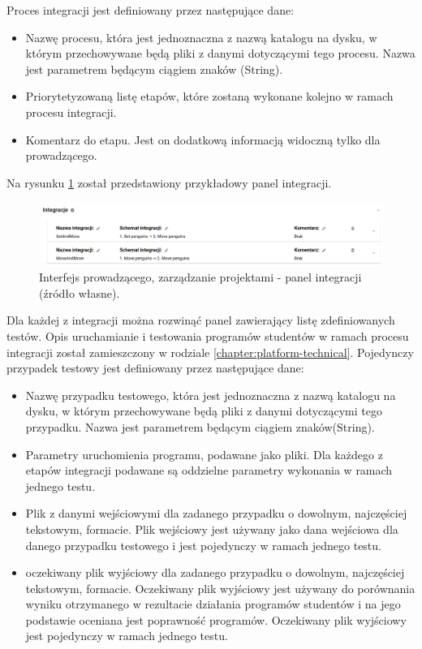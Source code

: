Proces integracji jest definiowany przez następujące dane:
\begin {itemize}
    \item Nazwę procesu, która jest jednoznaczna z nazwą katalogu na dysku, w którym przechowywane będą pliki z danymi dotyczącymi tego procesu.
    Nazwa jest parametrem będącym ciągiem znaków (String).
    \item Priorytetyzowaną listę etapów, które zostaną wykonane kolejno w ramach procesu integracji.
    \item Komentarz do etapu.
    Jest on dodatkową informacją widoczną tylko dla prowadzącego.
\end {itemize}

Na rysunku \ref{fig:lecturer_integrations} został przedstawiony przykładowy panel integracji.

\begin{figure}[h]
    \centering
    \includegraphics[width = 15cm]{chapter04/lecturer_integrations.png}
    \caption{Interfejs prowadzącego, zarządzanie projektami - panel integracji (źródło własne).}
    \label{fig:lecturer_integrations}
\end{figure}

Dla każdej z integracji można rozwinąć panel zawierający listę zdefiniowanych testów.
Opis uruchamianie i testowania programów studentów w ramach procesu integracji został zamieszczony w rodziale \ref{chapter:platform-technical}.
Pojedynczy przypadek testowy jest definiowany przez następujące dane:
\begin {itemize}
    \item Nazwę przypadku testowego, która jest jednoznaczna z nazwą katalogu na dysku, w którym przechowywane będą pliki z danymi dotyczącymi tego przypadku.
    Nazwa jest parametrem będącym ciągiem znaków(String).
    \item Parametry uruchomienia programu, podawane jako pliki.
    Dla każdego z etapów integracji podawane są oddzielne parametry wykonania w ramach jednego testu.
    \item Plik z danymi wejściowymi dla zadanego przypadku o dowolnym, najczęściej tekstowym, formacie.
    Plik wejściowy jest używany jako dana wejściowa dla danego przypadku testowego i jest pojedynczy w ramach jednego testu.
    \item oczekiwany plik wyjściowy dla zadanego przypadku o dowolnym, najczęściej tekstowym, formacie.
    Oczekiwany plik wyjściowy jest używany do porównania wyniku otrzymanego w rezultacie działania programów studentów i na jego podstawie oceniana jest poprawność programów.
    Oczekiwany plik wyjściowy jest pojedynczy w ramach jednego testu.
\end {itemize}

